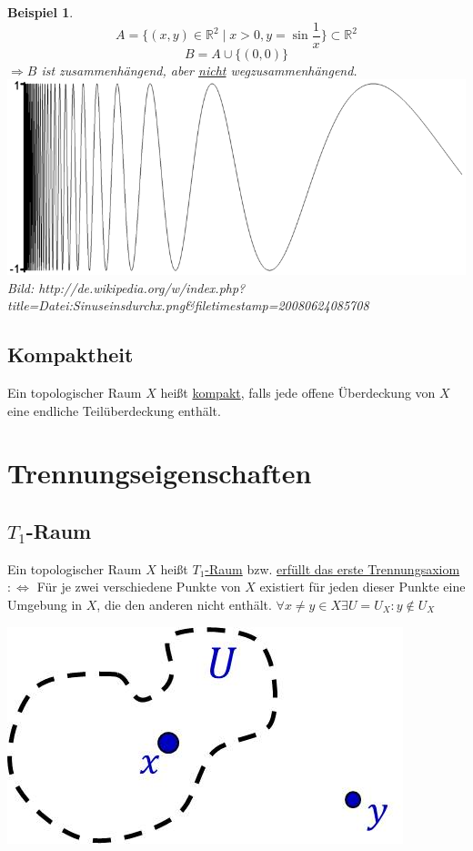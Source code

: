 \documentclass[a4paper,11pt,notitlepage]{report}
\newtheorem{example}{Beispiel}[chapter]
\newcommand{\R}{{\ensuremath{\mathbb{R}}}}
\newenvironment{Kasten}[1]
{
\hspace{0.05\linewidth}
\begin{center}
\begin{minipage}{0.9\linewidth}
\setlength{\fboxsep}{10pt}
\definecolor{shadecolor}{gray}{1}
\definecolor{framecolor}{gray}{0}
\def\FrameCommand{\fcolorbox{framecolor}{shadecolor}}
\MakeFramed {\FrameRestore}
\subsection{#1}
\begin{itshape}
}
{
\end{itshape}
\endMakeFramed
\end{minipage}
\end{center}
}
\begin{document}
\begin{example}
	$$A=\{(x,y) \in \R^2 \mid x>0, y = \sin{\frac{1}{x}}\} \subset \R^2$$
	$$B=A \cup \{(0,0)\}$$
	$\Rightarrow B$ ist zusammenhängend, aber \underline{nicht} wegzusammenhängend.
	\newline
	\includegraphics[scale=0.4]{images/Sinuseinsdurchx.png}
	\newline
	\scriptsize{Bild: http://de.wikipedia.org/w/index.php?title=Datei:Sinuseinsdurchx.png\&filetimestamp=20080624085708}
\end{example}

\begin{Kasten}{Kompaktheit}
	Ein topologischer Raum $X$ heißt \underline{kompakt}, falls jede offene Überdeckung von $X$ eine endliche Teilüberdeckung enthält.
\end{Kasten}

\section{Trennungseigenschaften}
\begin{Kasten}{$T_1$-Raum}
Ein topologischer Raum $X$ heißt \underline{$T_1$-Raum} bzw. \underline{erfüllt das erste Trennungsaxiom} $:\Leftrightarrow$ Für je zwei verschiedene Punkte von $X$ existiert für jeden dieser Punkte eine Umgebung in $X$, die den anderen nicht enthält.
\newline
$\forall x \neq y \in X \exists U = U_X \colon y \notin U_X$ 
\end{Kasten}
\includegraphics[scale=0.4]{images/T1.jpg}
\end{document}
